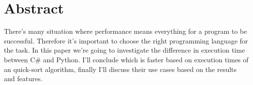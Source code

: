 \section*{Abstract}

There's many situation where performance means everything for a program to be successful. Therefore it's important to choose the right programming language for the task. In this paper we're going to investigate the difference in execution time between C\# and Python. I'll conclude which is faster based on execution times of an quick-sort algorithm, finally I'll discuss their use cases based on the results and features.